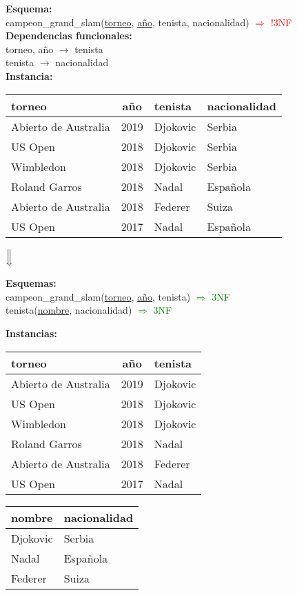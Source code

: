 \documentclass[preview]{standalone}
\begin{document}
\textbf{Esquema:}\\
campeon\_grand\_slam(\underline{torneo}, \underline{a\~no}, tenista, nacionalidad) \textcolor{red}{$\Rightarrow$ !3NF}\\

\textbf{Dependencias funcionales:}\\
torneo, a\~no $\rightarrow$ tenista\\
tenista $\rightarrow$ nacionalidad\\

\textbf{Instancia:}
\begin{center}
\scriptsize
\begin{tabular}{| l | c | l | l |}\hline			
	torneo & a\~no & tenista & nacionalidad  \\\hline			
	Abierto de Australia & 2019 & Djokovic & Serbia \\
	US Open & 2018 & Djokovic & Serbia \\
	Wimbledon & 2018 & Djokovic & Serbia \\
	Roland Garros & 2018 & Nadal & Espa\~nola \\
	Abierto de Australia & 2018 & Federer & Suiza \\
	US Open & 2017 & Nadal & Espa\~nola \\\hline
\end{tabular}



$\Big\Downarrow$
\end{center}

\textbf{Esquemas:}\\
campeon\_grand\_slam(\underline{torneo}, \underline{a\~no}, tenista) \textcolor{green}{$\Rightarrow$ 3NF}\\
tenista(\underline{nombre}, nacionalidad) \textcolor{green}{$\Rightarrow$ 3NF}


\textbf{Instancias:}
\begin{center}
\scriptsize
\begin{tabular}{| l | c | l |}\hline			
	torneo & a\~no & tenista \\\hline			
	Abierto de Australia & 2019 & Djokovic \\
	US Open & 2018 & Djokovic \\
	Wimbledon & 2018 & Djokovic \\
	Roland Garros & 2018 & Nadal \\
	Abierto de Australia & 2018 & Federer \\
	US Open & 2017 & Nadal \\\hline
\end{tabular}
\quad
\begin{tabular}{| l | l |}\hline			
	nombre & nacionalidad \\\hline	
	Djokovic & Serbia\\		
	Nadal & Espa\~nola\\		
	Federer & Suiza\\\hline		
\end{tabular}
\end{center}
\end{document}
